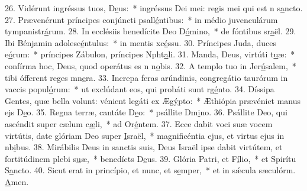 26. Vidérunt ingréssus tuos, D\uline{e}us:~* ingréssus Dei mei: regis mei qui est n s\uline{a}ncto.
27. Prævenérunt príncipes conjúncti psall\uline{é}ntibus:~* in médio juvenculárum tympanistr\uline{á}rum.
28. In ecclésiis benedícite Deo D\uline{ó}mino,~* de fóntibus sr\uline{a}ël.
29. Ibi Bénjamin adolesc\uline{é}ntulus:~* in mentis xc\uline{é}ssu.
30. Príncipes Juda, duces e\uline{ó}rum:~* príncipes Zábulon, príncipes Npht\uline{a}li.
31. Manda, Deus, virtúti t\uline{u}æ:~* confírma hoc, Deus, quod operátus es n n\uline{o}bis.
32. A templo tuo in Jer\uline{ú}salem,~* tibi ófferent reges mn\uline{e}ra.
33. Increpa feras arúndinis, congregátio taurórum in vaccis popul\uline{ó}rum:~* ut exclúdant eos, qui probáti sunt rg\uline{é}nto.
34. Díssipa Gentes, quæ bella volunt: vénient legáti ex Æg\uline{ý}pto:~* Æthiópia prævéniet manus ejs D\uline{e}o.
35. Regna terræ, cantáte D\uline{e}o:~* psállite Dm\uline{i}no.
36. Psállite Deo, qui ascéndit super cælum c\uline{æ}li,~* ad Or\uline{é}ntem.
37. Ecce dabit voci suæ vocem virtútis, date glóriam Deo super \uline{I}sraël,~* magnificéntia ejus, et virtus ejus in nb\uline{i}bus.
38. Mirábilis Deus in sanctis suis, Deus Israël ipse dabit virtútem, et fortitúdinem plebi s\uline{u}æ,~* benedícts D\uline{e}us.
39. Glória Patri, et F\uline{í}lio,~* et Spirítu S\uline{a}ncto.
40. Sicut erat in princípio, et nunc, et s\uline{e}mper,~* et in sǽcula sæculórm. \uline{A}men.
